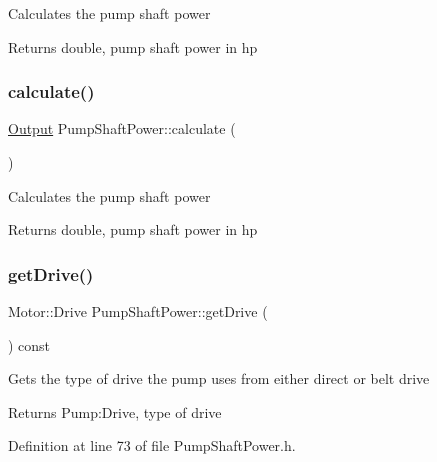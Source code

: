 Calculates the pump shaft power \begin{DoxyReturn}{Returns}
double, pump shaft power in hp 
\end{DoxyReturn}
\mbox{\label{class_pump_shaft_power_a5398dac8dedd059b0eefdcfe8cdbda60}} 
\subsubsection{\texorpdfstring{calculate()}{calculate()}\hspace{0.1cm}{\footnotesize\ttfamily [3/3]}}
{\footnotesize\ttfamily \hyperlink{struct_pump_shaft_power_1_1_output}{Output} Pump\+Shaft\+Power\+::calculate (\begin{DoxyParamCaption}{ }\end{DoxyParamCaption})}

Calculates the pump shaft power \begin{DoxyReturn}{Returns}
double, pump shaft power in hp 
\end{DoxyReturn}
\mbox{\label{class_pump_shaft_power_a382653196fd65562cd3823049ab7573a}} 
\subsubsection{\texorpdfstring{get\+Drive()}{getDrive()}\hspace{0.1cm}{\footnotesize\ttfamily [1/3]}}
{\footnotesize\ttfamily Motor\+::\+Drive Pump\+Shaft\+Power\+::get\+Drive (\begin{DoxyParamCaption}{ }\end{DoxyParamCaption}) const\hspace{0.3cm}{\ttfamily [inline]}}

Gets the type of drive the pump uses from either direct or belt drive \begin{DoxyReturn}{Returns}
Pump\+:Drive, type of drive 
\end{DoxyReturn}


Definition at line 73 of file Pump\+Shaft\+Power.\+h.

\mbox{\label{class_pump_shaft_power_a382653196fd65562cd3823049ab7573a}} 
